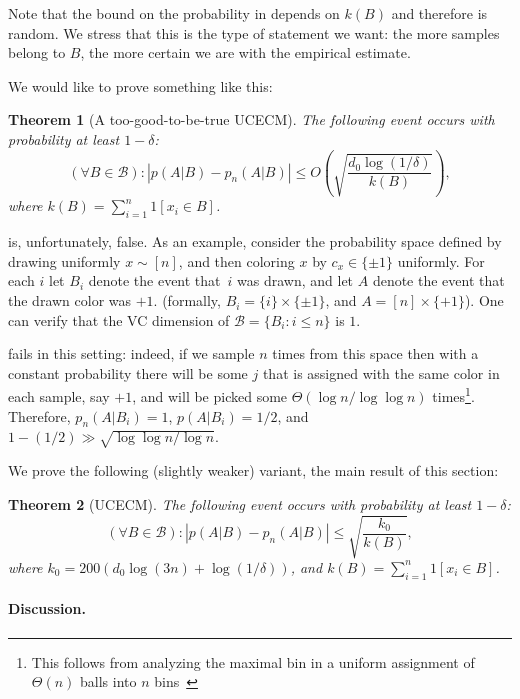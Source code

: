 \documentclass{article}
\def\B{{\mathcal B}}
\newtheorem{theorem}{Theorem}
\newcommand{\comment}[3]{}  %
\newcommand{\shay}[1]{\comment{purple}{Shay}{#1}}
\begin{document}
Note that the bound on the probability in  depends on $k(B)$
and therefore is random.
We stress that this is the type of statement we want:
the more samples belong to $B$, the more certain we are with the empirical estimate.

We would like to prove something like this:
\begin{theorem}[A too-good-to-be-true UCECM]\label{thm:toogood}
The following event occurs with probability at least $1-\delta$:
\[\left(\forall B\in\B\right):\left\lvert p(A \vert B) - p_n(A \vert B) \right\rvert \leq O\left(\sqrt{\frac{d_0 \log(1/\delta)}{k(B)}}\right),\]
where $k(B) = \sum_{i=1}^n 1[x_i\in B]$.
\end{theorem}
 is, unfortunately, false. 
As an example, consider the probability space defined by drawing uniformly $x\sim[n]$,
and then coloring $x$ by $c_x\in\{\pm 1\}$ uniformly.
For each $i$ let $B_i$ denote the event that~$i$ was drawn,
and let $A$ denote the event that the drawn color was  $+1$.
(formally, $B_i = \{i\}\times\{\pm 1\}$, and $A=[n]\times\{+1\}$).
One can verify that the VC dimension of $\B=\{B_i : i\leq n\}$ is $1$.

 fails in this setting:
indeed, if we sample $n$ times from this space 
then with a constant probability there will be some  $j$
that is assigned with the same color in each sample,  say $+1$, 
and will be picked some $\Theta(\log n/\log\log n)$ times\footnote{{This follows from analyzing the maximal bin
in a uniform assignment of $\Theta(n)$ balls into $n$ bins~\cite{bins}}}.
Therefore, $p_n(A\vert B_i) = 1$, $p(A\vert B_i)=1/2$,
and $1-(1/2) \gg \sqrt{\log\log n/\log n}$.

We prove the following (slightly weaker) variant, the main result of this section:
\begin{theorem}[UCECM]\label{thm:UCECM}
The following event occurs with probability at least $1-\delta$:
\[\left(\forall B\in\B\right):\left\lvert p(A \vert B) - p_n(A \vert B) \right\rvert \leq 
\sqrt{\frac{k_0}{k(B)}},\]
where $k_0 = 200 \left(d_0 \log(3n) + \log(1/\delta)\right)$, and $k(B) = \sum_{i=1}^n 1[x_i\in B]$.
\end{theorem}

\paragraph{Discussion.}
\end{document}
